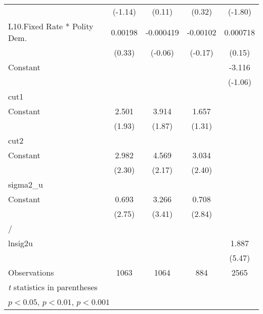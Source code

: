 {\begin{longtable}{l*{4}{c}}
                &  (-1.14)         &   (0.11)         &   (0.32)         &  (-1.80)         \\
[1em]
L10.Fixed Rate * Polity Dem.&  0.00198         &-0.000419         & -0.00102         & 0.000718         \\
                &   (0.33)         &  (-0.06)         &  (-0.17)         &   (0.15)         \\
[1em]
Constant        &                  &                  &                  &   -3.116         \\
                &                  &                  &                  &  (-1.06)         \\
\hline
cut1            &                  &                  &                  &                  \\
Constant        &    2.501         &    3.914         &    1.657         &                  \\
                &   (1.93)         &   (1.87)         &   (1.31)         &                  \\
\hline
cut2            &                  &                  &                  &                  \\
Constant        &    2.982\sym{*}  &    4.569\sym{*}  &    3.034\sym{*}  &                  \\
                &   (2.30)         &   (2.17)         &   (2.40)         &                  \\
\hline
sigma2\_u        &                  &                  &                  &                  \\
Constant        &    0.693\sym{**} &    3.266\sym{***}&    0.708\sym{**} &                  \\
                &   (2.75)         &   (3.41)         &   (2.84)         &                  \\
\hline
/               &                  &                  &                  &                  \\
lnsig2u         &                  &                  &                  &    1.887\sym{***}\\
                &                  &                  &                  &   (5.47)         \\
\hline
Observations    &     1063         &     1064         &      884         &     2565         \\
\hline\hline
\multicolumn{5}{l}{\footnotesize \textit{t} statistics in parentheses}\\
\multicolumn{5}{l}{\footnotesize \sym{*} \(p<0.05\), \sym{**} \(p<0.01\), \sym{***} \(p<0.001\)}\\
\end{longtable}
}
